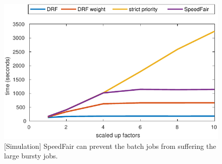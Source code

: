 \begin{figure}
\centering
\includegraphics[width=1.0\linewidth]{fig/BB-scaled_bursty}
\caption{[Simulation] SpeedFair can prevent the batch jobs from suffering the large bursty jobs. }
\label{fig:BB-scaled_bursty}
\end{figure}
